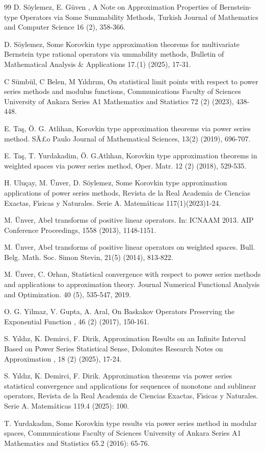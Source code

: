 \documentclass{amsart}
\theoremstyle{plain}
\numberwithin{equation}{section}
\begin{document}
\begin{thebibliography}{99}
D. S\"{o}ylemez, E. G\"{u}ven , A Note on Approximation
Properties of Bernstein-type Operators via Some Summability Methods, Turkish
Journal of Mathematics and Computer Science 16 (2), 358-366.

D. S\"{o}ylemez, Some Korovkin type approximation theorems
for multivariate Bernstein type rational operators via ummability methods,
Bulletin of Mathematical Analysis \& Applications 17.(1) (2025), 17-31.

C S\"{u}mb\"{u}l, C Belen, M Y\i ld\i r\i m, On statistical limit points with respect to power series methods and modulus functions,
Communications Faculty of Sciences University of Ankara Series A1 Mathematics
and Statistics 72 (2) (2023), 438-448.

E. Ta\c{s}, \"{O}. G. Atlihan, Korovkin type
approximation theorems via power series method. S\~{A}\pounds o Paulo Journal
of Mathematical Sciences, 13(2) (2019), 696-707.

E. Ta\c{s}, T. Yurdakadim, \"{O}. G.Atl\i han,
Korovkin type approximation theorems in weighted spaces via power series
method, Oper. Matr. 12 (2) (2018), 529-535.

H. Ulu\c{c}ay, M. \"{U}nver, D. S\"{o}ylemez, Some
Korovkin type approximation applications of power series methods, Revista de
la Real Academia de Ciencias Exactas, F\'{\i}sicas y Naturales. Serie A.
Matem\'{a}ticas 117(1)(2023)1-24.

M. \"{U}nver, Abel transforms of positive linear operators.
In: ICNAAM 2013. AIP Conference Proceedings, 1558 (2013), 1148-1151.

M. \"{U}nver, Abel transforms of positive linear operators on
weighted spaces. Bull. Belg. Math. Soc. Simon Stevin, 21(5) (2014), 813-822.

M. \"{U}nver, C. Orhan, Statistical convergence
with respect to power series methods and applications to approximation theory.
Journal Numerical Functional Analysis and Optimization. 40 (5), 535-547, 2019.

O. G. Yilmaz, V. Gupta, A. Aral, On Baskakov Operators
Preserving the Exponential Function , 46 (2) (2017), 150-161.

S. Y\i ld\i z, K. Demirci, F. Dirik,  Approximation Results
on an Infinite Interval Based on Power Series Statistical Sense, Dolomites
Research Notes on Approximation , 18 (2) (2025), 17-24.

S. Y\i ld\i z, K. Demirci, F. Dirik.
Approximation theorems via power series statistical convergence and
applications for sequences of monotone and sublinear operators,  Revista de la
Real Academia de Ciencias Exactas, F\'{\i}sicas y Naturales. Serie A.
Matem\'{a}ticas 119.4 (2025): 100.

T. Yurdakad\i m,  Some Korovkin type results via power
series method in modular spaces, Communications Faculty of Sciences
University of Ankara Series A1 Mathematics and Statistics 65.2 (2016): 65-76.
\end{thebibliography}
\end{document}
